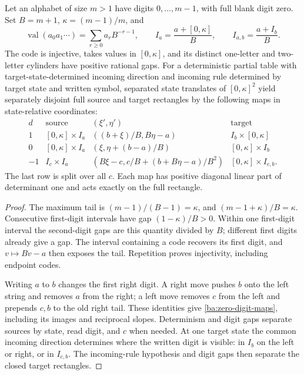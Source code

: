 \begin{lemma}\label{ba:zero-blank-code}
Let an alphabet of size $m>1$ have digits $0,\ldots,m-1$, with full
blank digit zero.  Set $B=m+1$, $\kappa=(m-1)/m$, and
\[
 \operatorname{val}(a_0a_1\cdots)=\sum_{r\ge0}a_rB^{-r-1},\qquad
 I_a=\frac{a+[0,\kappa]}B,\qquad I_{a,b}=\frac{a+I_b}B.
\]
The code is injective, takes values in $[0,\kappa]$, and its distinct
one-letter and two-letter cylinders have positive rational gaps.  For a
deterministic partial table with target-state-determined incoming direction
and incoming rule determined by target state and written symbol, separated
state translates of $[0,\kappa]^2$ yield separately disjoint full source
and target rectangles by the following maps in state-relative coordinates:
\begin{equation}\label{ba:zero-digit-maps}
 \begin{array}{c|c|c|c}
 d&\text{source}&(\xi',\eta')&\text{target}\\\hline
 1&[0,\kappa]\times I_a&((b+\xi)/B,B\eta-a)&I_b\times[0,\kappa]\\
 0&[0,\kappa]\times I_a&(\xi,\eta+(b-a)/B)&[0,\kappa]\times I_b\\
 -1&I_c\times I_a&(B\xi-c,c/B+(b+B\eta-a)/B^2)&
                                      [0,\kappa]\times I_{c,b}.
 \end{array}
\end{equation}
The last row is split over all $c$.  Each map has positive diagonal
linear part of determinant one and acts exactly on the full rectangle.
\end{lemma}

\begin{proof}\label{ba:zero-blank-code-proof}
The maximum tail is $(m-1)/(B-1)=\kappa$, and
$(m-1+\kappa)/B=\kappa$.  Consecutive first-digit intervals have
gap $(1-\kappa)/B>0$.  Within one first-digit interval the second-digit
gaps are this quantity divided by $B$; different first digits already
give a gap.  The interval containing a code recovers its first digit,
and $v\mapsto Bv-a$ then exposes the tail.  Repetition proves
injectivity, including endpoint codes.

Writing $a$ to $b$ changes the first right digit.  A right move pushes
$b$ onto the left string and removes $a$ from the right; a left move
removes $c$ from the left and prepends $c,b$ to the old right tail.
These identities give \eqref{ba:zero-digit-maps}, including its images
and reciprocal slopes.  Determinism and digit gaps separate sources by
state, read digit, and $c$ when needed.  At one target state the common
incoming direction determines where the written digit is visible: in
$I_b$ on the left or right, or in $I_{c,b}$.  The incoming-rule
hypothesis and digit gaps then separate the closed target rectangles.
\end{proof}

